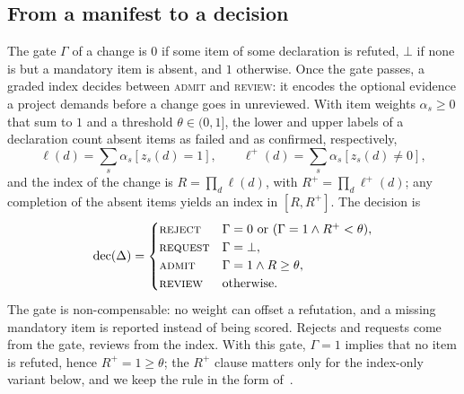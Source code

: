 \documentclass[conference]{IEEEtran}
\newcommand{\dec}[1]{\textsc{#1}}
\newcommand{\Dec}{\mathrm{dec}}
\begin{document}
\subsection{From a manifest to a decision}
The gate $\Gamma$ of a change is $0$ if some item of some declaration is refuted, $\bot$ if none is but a mandatory
item is absent, and $1$ otherwise. Once the gate passes, a graded index decides between \dec{admit} and \dec{review}:
it encodes the optional evidence a project demands before a change goes in unreviewed. With item weights
$\alpha_s\ge 0$ that sum to $1$ and a threshold $\theta\in(0,1]$, the lower and upper labels of a declaration count
absent items as failed and as confirmed, respectively,
\begin{equation}
\ell(d)=\sum_{s}\alpha_s[z_s(d)=1],\qquad \ell^{+}(d)=\sum_{s}\alpha_s[z_s(d)\neq 0],
\label{eq:labels}
\end{equation}
and the index of the change is $R=\prod_{d}\ell(d)$, with $R^{+}=\prod_{d}\ell^{+}(d)$; any completion of the absent
items yields an index in $[R,R^{+}]$. The decision is
\begin{equation}
\Dec(\Delta)=\begin{cases}
\dec{reject} & \Gamma=0 \ \text{or}\ (\Gamma=1 \wedge R^{+}<\theta),\\
\dec{request} & \Gamma=\bot,\\
\dec{admit} & \Gamma=1 \wedge R\ge\theta,\\
\dec{review} & \text{otherwise}.
\end{cases}
\label{eq:rule}
\end{equation}
The gate is non-compensable: no weight can offset a refutation, and a missing mandatory item is reported instead of
being scored. Rejects and requests come from the gate, reviews from the index. With this gate, $\Gamma=1$ implies that
no item is refuted, hence $R^{+}=1\ge\theta$; the $R^{+}$ clause matters only for the index-only variant below, and we
keep the rule in the form of~\cite{anon2026evidence}.
\end{document}
